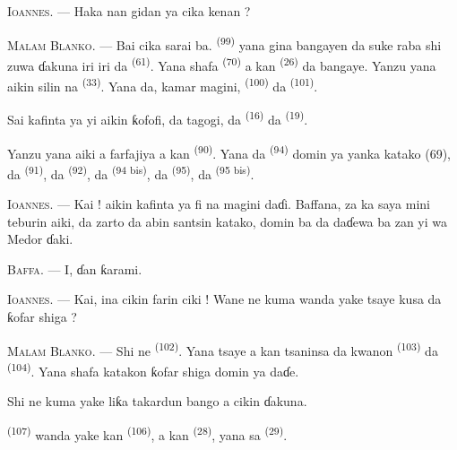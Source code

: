 \textsc{Ioannes}. --- Haka nan gidan ya cika kenan ?

\VUsaut{3.0mm}
\VUsaut{3.0mm}

\textsc{Malam Blanko}. --- Bai cika sarai ba.  \textsuperscript{(99)} yana gina bangayen da suke raba shi zuwa
ɗakuna iri iri da  \textsuperscript{(61)}. Yana shafa
 \textsuperscript{(70)} a kan 
\textsuperscript{(26)} da bangaye. Yanzu yana aikin silin na
 \textsuperscript{(33)}. Yana da, kamar magini,
 \textsuperscript{(100)} da 
\textsuperscript{(101)}.

Sai kafinta ya yi aikin ƙofofi, da tagogi, da 
\textsuperscript{(16)} da  \textsuperscript{(19)}.

Yanzu yana aiki a farfajiya a kan 
\textsuperscript{(90)}. Yana da  \textsuperscript{(94)}
domin ya yanka katako (69), da 
\textsuperscript{(91)}, da 
\textsuperscript{(92)}, da 
\textsuperscript{(94 bis)}, da  \textsuperscript{(95)},
da  \textsuperscript{(95 bis)}.

\textsc{Ioannes}. --- Kai ! aikin kafinta ya fi na magini daɗi.
Baffana, za ka saya mini teburin aiki, da zarto da abin santsin
katako, domin ba da daɗewa ba zan yi wa Medor ɗaki.

\textsc{Baffa}. --- I, ɗan ƙarami.

\textsc{Ioannes}. --- Kai, ina cikin farin ciki ! Wane ne kuma wanda
yake tsaye kusa da ƙofar shiga ?

\VUsaut{3.0mm}
\VUsaut{3.0mm}

\textsc{Malam Blanko}. --- Shi ne 
\textsuperscript{(102)}. Yana tsaye a kan tsaninsa da kwanon
 \textsuperscript{(103)} da 
\textsuperscript{(104)}. Yana shafa katakon ƙofar shiga domin ya daɗe.

Shi ne kuma yake liƙa takardun bango a cikin ɗakuna.

 \textsuperscript{(107)} wanda yake kan
 \textsuperscript{(106)}, a kan 
\textsuperscript{(28)}, yana sa 
\textsuperscript{(29)}.

